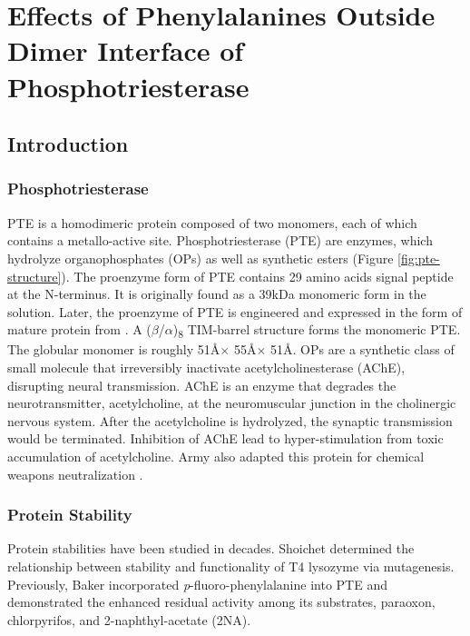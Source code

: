 \chapter{Effects of Phenylalanines Outside Dimer Interface of Phosphotriesterase}
\label{chap:dimer}
\begin{refsection}

\section{Introduction}

\subsection{Phosphotriesterase}

PTE is a homodimeric protein composed of two monomers, each of which contains a
metallo-active site. Phosphotriesterase (PTE) are enzymes, which hydrolyze
organophosphates (OPs) as well as synthetic esters (Figure
\ref{fig:pte-structure})\cite{Ghanem2005a}. The proenzyme form of PTE contains
29 amino acids signal peptide at the N-terminus. It is originally found as a
39kDa monomeric form in the solution\cite{Mulbry1989}. Later, the proenzyme of
PTE is engineered and expressed in the form of mature protein from . A ($\beta$/$\alpha$)\textsubscript{8} TIM-barrel structure forms the
monomeric PTE\cite{Roodveldt2005,Seibert2005}. The globular monomer is roughly
51\AA $\times$ 55\AA $\times$ 51\AA.  OPs are a synthetic class of small molecule
that irreversibly inactivate acetylcholinesterase (AChE), disrupting
neural transmission. AChE is an enzyme that degrades the neurotransmitter,
acetylcholine, at the neuromuscular junction in the cholinergic nervous system.
After the acetylcholine is hydrolyzed, the synaptic transmission would be
terminated. Inhibition of AChE lead to hyper-stimulation from toxic
accumulation of acetylcholine\cite{Soreq2001}. Army also adapted this protein
for chemical weapons neutralization \cite{Yang2014a}.

\subsection{Protein Stability}

Protein stabilities have been studied in decades. Shoichet 
determined the relationship between stability and functionality of T4 lysozyme
via mutagenesis\cite{Shoichet1995}. Previously, Baker 
incorporated \emph{p}-fluoro-phenylalanine into PTE and demonstrated the
enhanced residual activity among its substrates, paraoxon, chlorpyrifos, and
2-naphthyl-acetate (2NA)\cite{Baker2011b}.  


\end{refsection}
